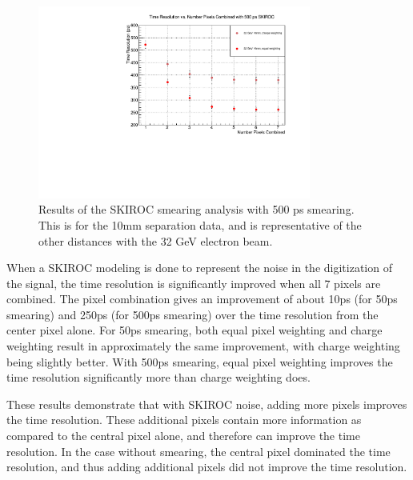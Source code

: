 \documentclass[twocolumn,aps,prd,reprint]{revtex4-1}
\begin{document}
\begin{figure}[!htbp]
\centering
\includegraphics[width = 0.8\textwidth]{smearing_500_10mm}
\caption{Results of the SKIROC smearing analysis with 500 ps smearing. This is for the 10mm separation data, and is representative of the other distances with the 32 GeV electron beam.}
\label{500 smearing}
\end{figure}

When a SKIROC modeling is done to represent the noise in the digitization of the signal, the time resolution is significantly improved when all 7 pixels are combined. The pixel combination gives an improvement of about 10ps (for 50ps smearing) and 250ps (for 500ps smearing) over the time resolution from the center pixel alone. For 50ps smearing, both equal pixel weighting and charge weighting result in approximately the same improvement, with charge weighting being slightly better. With 500ps smearing, equal pixel weighting improves the time resolution significantly more than charge weighting does.

These results demonstrate that with SKIROC noise, adding more pixels improves the time resolution. These additional pixels contain more information as compared to the central pixel alone, and therefore can improve the time resolution. In the case without smearing, the central pixel dominated the time resolution, and thus adding additional pixels did not improve the time resolution. 
\end{document}
